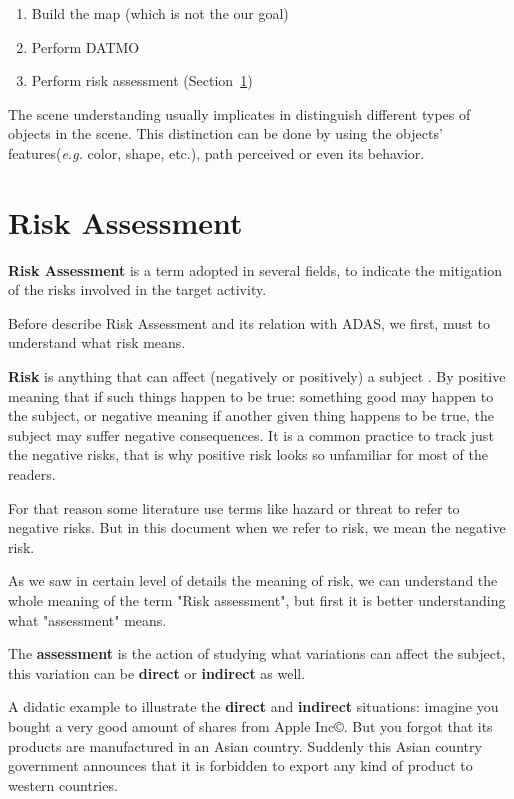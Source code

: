 \begin{enumerate}
\item Build the map (which is not the our goal)
\item Perform DATMO
\item Perform risk assessment (Section~\ref{sec:riskassessment})
\end{enumerate}

The scene understanding usually implicates in distinguish different types of objects in the scene. This distinction can be done by using the objects' features(\textit{e.g.} color, shape, etc.), path perceived or even its behavior. 


\section{Risk Assessment}
\label{sec:riskassessment}

\textbf{Risk Assessment} is a term adopted in several fields, to indicate the mitigation of the risks involved in the target activity. 

Before describe Risk Assessment and its relation with ADAS, we first, must to understand what risk means.

\textbf{Risk} is anything that can affect (negatively or positively) a subject \cite{mulcahy2011pmp}. By positive meaning that if such things happen to be true: something good may happen to the subject, or negative meaning if another given thing happens to be true, the subject may suffer negative consequences. It is a common practice to track just the negative risks, that is why positive risk looks so unfamiliar for most of the readers. 

For that reason some literature use terms like hazard or threat to refer to negative risks. But in this document when we refer to risk, we mean the negative risk.

As we saw in certain level of details the meaning of risk, we can understand the whole meaning of the term "Risk assessment", but first it is better understanding what "assessment" means.

The \textbf{assessment} is the action of studying what variations can affect the subject, this variation can be \textbf{direct} or \textbf{indirect} as well.

A didatic example to illustrate the \textbf{direct} and \textbf{indirect} situations: imagine you bought a very good amount of shares from Apple Inc\copyright. But you forgot that its products are manufactured in an Asian country. Suddenly this Asian country government announces that it is forbidden to export any kind of product to western countries. 

